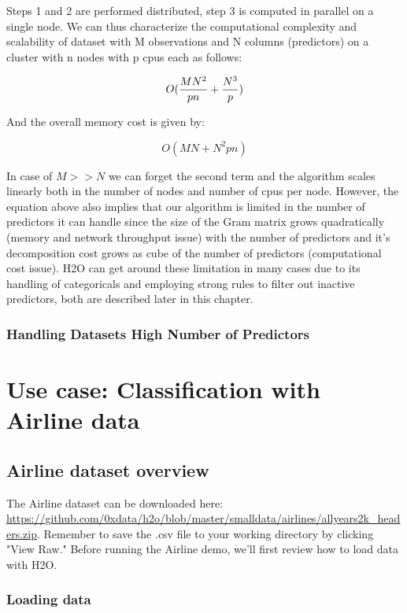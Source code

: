 \documentclass[11pt]{article}
\begin{document}
Steps 1 and 2 are performed distributed, step 3 is computed in parallel on a single node. We can thus characterize the computational complexity and scalability of dataset with M observations and N columns (predictors) on a cluster with n nodes with p cpus each as follows:

\[ O({MN^2 \over pn} + {N^3 \over p})\]

And the overall memory cost is given by:

\[ O(MN + N^2pn)\]

In case of $M >> N$ we can forget the second term and the algorithm scales linearly both in the number of nodes and number of cpus per node. However, the equation above also implies that our algorithm is limited in the number of predictors it can handle since the size of the Gram matrix grows quadratically (memory and network throughput issue) with the number of predictors and it's decomposition cost grows as cube of the number of predictors (computational cost issue). H2O can get around these limitation in many cases due to its handling of categoricals and employing strong rules to filter out inactive predictors, both are described later in this chapter.  
\subsubsection{Handling Datasets High Number of Predictors}


\section{Use case: Classification with Airline data}


\subsection{Airline dataset overview} 

The Airline dataset can be downloaded here: \url{https://github.com/0xdata/h2o/blob/master/smalldata/airlines/allyears2k_headers.zip}. Remember to save the .csv file to your working directory by clicking  "View Raw."  Before running the Airline demo, we'll first review how to load data with H2O. 

\subsubsection{Loading data} \label{2.5}
\end{document}
